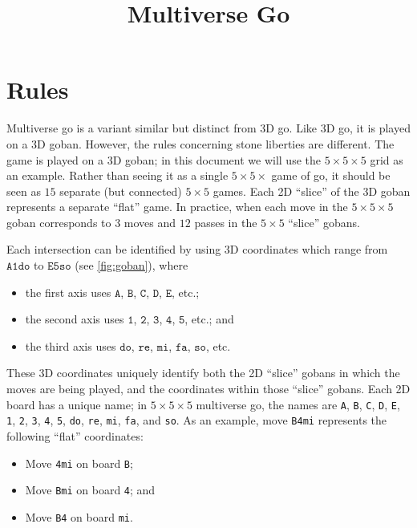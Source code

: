 \documentclass[twocolumn]{article}
\title{Multiverse Go}
\date{}
\begin{document}
\maketitle

\pagestyle{empty}

\section{Rules}

Multiverse go is a variant similar but distinct from 3D go.  Like 3D go, it is
played on a 3D goban.  However, the rules concerning stone liberties are
different.
%
The game is played on a 3D goban;  in this document we will use the $5\times
5\times 5$ grid as an example.  Rather than seeing it as a single $5 \times
5\times$ game of go, it should be seen as $15$ separate (but connected)
$5\times 5$ games.  Each 2D ``slice'' of the 3D goban represents a separate
``flat'' game.  In practice, when each move in the $5\times 5\times 5$ goban
corresponds to $3$ moves and $12$ passes in the $5\times 5$ ``slice'' gobans.

Each intersection can be identified by using 3D coordinates which range from
$\texttt{A1do}$ to $\texttt{E5so}$ (see \cref{fig:goban}), where
%
\begin{itemize}
  \item the first axis uses $\texttt{A}$, $\texttt{B}$, $\texttt{C}$,
    $\texttt{D}$, $\texttt{E}$, etc.;
  \item the second axis uses $\texttt{1}$, $\texttt{2}$, $\texttt{3}$,
    $\texttt{4}$, $\texttt{5}$, etc.; and
  \item the third axis uses $\texttt{do}$, $\texttt{re}$, $\texttt{mi}$,
    $\texttt{fa}$, $\texttt{so}$, etc.
\end{itemize}


These 3D coordinates uniquely identify both the 2D ``slice'' gobans in which
the moves are being played, and the coordinates within those ``slice'' gobans.
%
Each 2D board has a unique name;  in $5\times 5\times 5$ multiverse go, the
names are 
%
\texttt{A}, \texttt{B}, \texttt{C}, \texttt{D}, \texttt{E},
%
\texttt{1}, \texttt{2}, \texttt{3}, \texttt{4}, \texttt{5},
%
\texttt{do}, \texttt{re}, \texttt{mi}, \texttt{fa}, and \texttt{so}.
%
As an example, move \texttt{B4mi} represents the following ``flat'' coordinates:
%
\begin{itemize}
  \item Move \texttt{4mi} on board \texttt{B};
  \item Move \texttt{Bmi} on board \texttt{4}; and
  \item Move \texttt{B4} on board \texttt{mi}.
\end{itemize}
\end{document}
